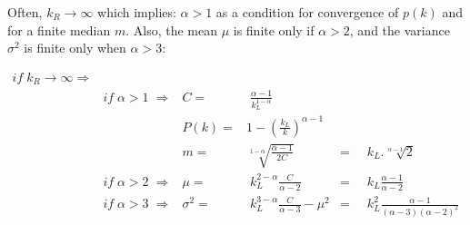 \documentclass[a4paper, 11pt]{article} %
\begin{document}
\begin{appendices}
Often, $k_R\rightarrow \infty$ which implies: $\alpha>1$ as a condition for convergence of $p(k)$ and for a finite median $m$. Also,
the mean $\mu$ is finite only if $\alpha>2$, and the
variance $\sigma^2$ is finite only when $\alpha>3$:

\begin{align}\label{eq:md}
	if \; k_R \rightarrow \infty \Rightarrow & & \nonumber\\
											      & if\; \alpha>1 \;\Rightarrow	& C = &\; \frac{\alpha-1}{k_L^{1-\alpha}}\nonumber\\
							   & & P(k) =& 1-\left(\frac{k_L}{k}\right)^{\alpha-1}\nonumber\\
										       &  & m  = & \sqrt[1-\alpha]{\frac{\alpha-1}{2C}}&=&\;\;k_L.\sqrt[\alpha-1]{2}&\\
							   & if\; \alpha>2 \;\Rightarrow	& \mu = & \;k_L^{2-\alpha}\frac{C}{\alpha-2}&= &\;\;k_L\frac{\alpha-1}{\alpha-2}& \nonumber\\
							& if\; \alpha>3 \;\Rightarrow	& \sigma^2 = & \;k_L^{3-\alpha}\frac{C}{\alpha-3}-\mu^2&= &\;\;k_L^2\frac{\alpha-1}{(\alpha-3)(\alpha-2)^2}&\nonumber
\end{align}





\end{appendices}



\end{document}
